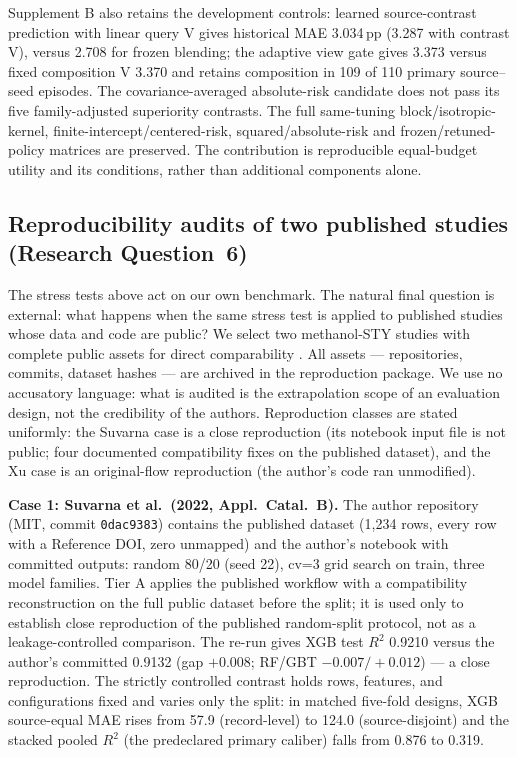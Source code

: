 \documentclass[11pt,a4paper]{article}
\newcommand{\pp}{\,pp}
\begin{document}
Supplement B also retains the development controls: learned source-contrast prediction with linear query V gives historical MAE 3.034\pp{} (3.287 with contrast V), versus 2.708 for frozen blending;
the adaptive view gate gives 3.373 versus fixed composition V 3.370 and retains composition in 109 of 110 primary source--seed episodes.
The covariance-averaged absolute-risk candidate does not pass its five family-adjusted superiority contrasts.
The full same-tuning block/isotropic-kernel, finite-intercept/centered-risk, squared/absolute-risk and frozen/retuned-policy matrices are preserved.
The contribution is reproducible equal-budget utility and its conditions, rather than additional components alone.


\subsection{Reproducibility audits of two published studies (Research Question~6)}
\label{sec:audit}
The stress tests above act on our own benchmark. The natural final question is external:
what happens when the same stress test is applied to published studies whose data and
code are public? We select two methanol-STY studies with complete public assets for
direct comparability \cite{suvarna,xu}. All assets --- repositories,
commits, dataset hashes --- are archived in the reproduction package. We use no
accusatory language: what is audited is the extrapolation scope of an evaluation design,
not the credibility of the authors. Reproduction classes are stated uniformly: the
Suvarna case is a close reproduction (its notebook input file is not public; four
documented compatibility fixes on the published dataset), and the Xu case is an
original-flow reproduction (the author's code ran unmodified).

\textbf{Case 1: Suvarna et al.\ (2022, Appl.\ Catal.\ B).} The author repository
(MIT, commit \texttt{0dac9383}) contains the published dataset (1{,}234 rows, every row
with a Reference DOI, zero unmapped) and the author's notebook with committed outputs:
random 80/20 (seed 22), cv=3 grid search on train, three model families. Tier A applies the
published workflow with a compatibility reconstruction on the full public dataset
before the split; it is used only to establish close reproduction of the
published random-split protocol, not as a leakage-controlled comparison. The
re-run gives XGB test $R^2$ 0.9210 versus the author's
committed 0.9132 (gap $+0.008$; RF/GBT $-0.007/+0.012$) --- a close reproduction. The
strictly controlled contrast holds rows, features, and configurations fixed and varies
only the split: in matched five-fold designs, XGB source-equal MAE rises from 57.9
(record-level) to 124.0 (source-disjoint) and the stacked pooled $R^2$ (the predeclared
primary caliber) falls from 0.876 to 0.319.
\end{document}
